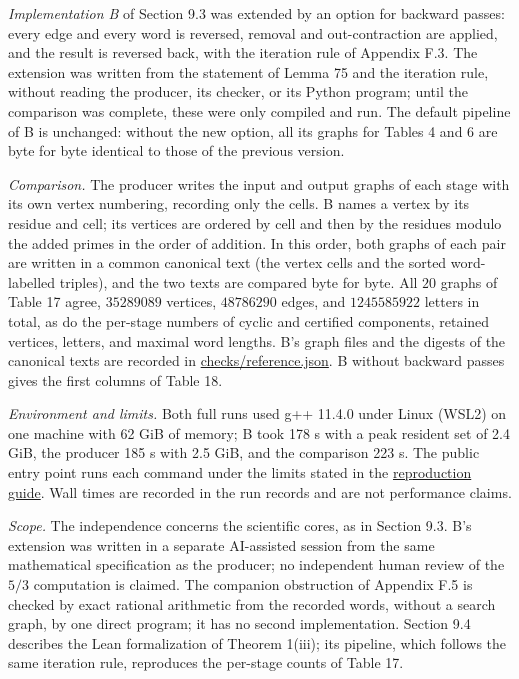 \documentclass[11pt,reqno]{amsart}
\theoremstyle{definition}
\theoremstyle{remark}
\begin{document}
\emph{Implementation B} of Section 9.3 was extended by an option for
backward passes: every edge and every word is reversed, removal and
out-contraction are applied, and the result is reversed back, with the
iteration rule of Appendix F.3. The extension was written from the
statement of Lemma 75 and the iteration rule, without reading the
producer, its checker, or its Python program; until the comparison was
complete, these were only compiled and run. The default pipeline of B is
unchanged: without the new option, all its graphs for Tables 4 and 6 are
byte for byte identical to those of the previous version.

\emph{Comparison.} The producer writes the input and output graphs of each
stage with its own vertex numbering, recording only the cells. B names a
vertex by its residue and cell; its vertices are ordered by cell and then
by the residues modulo the added primes in the order of addition. In
this order, both graphs of each pair are written in a common canonical
text (the vertex cells and the sorted word-labelled triples), and the
two texts are compared byte for byte. All \(20\) graphs of Table 17
agree, \(35289089\) vertices, \(48786290\) edges, and \(1245585922\)
letters in total, as do the per-stage numbers of cyclic and certified
components, retained vertices, letters, and maximal word lengths. B's
graph files and the digests of the canonical texts are recorded in
\href{checks/reference.json}{checks/reference.json}. B without backward passes gives
the first columns of Table 18.

\emph{Environment and limits.} Both full runs used g++ 11.4.0 under Linux
(WSL2) on one machine with 62 GiB of memory; B took 178 s with a peak
resident set of 2.4 GiB, the producer 185 s with 2.5 GiB, and the
comparison 223 s. The public entry point runs each command under the
limits stated in the \href{REPRODUCE.md}{reproduction guide}. Wall times are recorded in the run records and are
not performance claims.

\emph{Scope.} The independence concerns the scientific cores, as in
Section 9.3. B's extension was written in a separate AI-assisted session
from the same mathematical specification as the producer; no independent
human review of the \(5/3\) computation is claimed. The companion
obstruction of Appendix F.5 is checked by exact rational arithmetic from
the recorded words, without a search graph, by one direct program; it
has no second implementation. Section 9.4 describes the Lean formalization of Theorem 1(iii); its
pipeline, which follows the same iteration rule, reproduces the per-stage
counts of Table 17.
\end{document}
